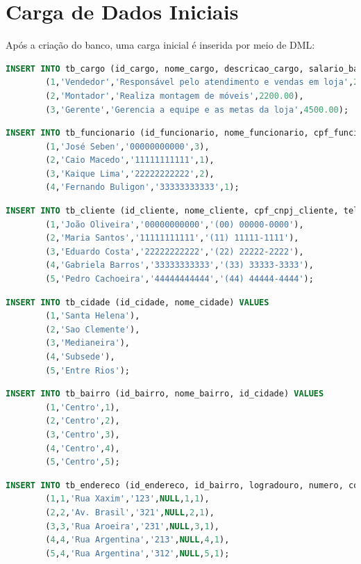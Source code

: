 \documentclass[
12pt,
a4paper,
semrecuonosumario,
sumario = abnt-6027-2012]{report}
\begin{document}
    \section{Carga de Dados Iniciais}\label{sec:carga}
    Após a criação do banco, uma carga inicial é inserida por meio de DML:
    
    \begin{lstlisting}[language=SQL,caption={DML -- Tabela \texttt{tb\_cargo}}]
		INSERT INTO tb_cargo (id_cargo, nome_cargo, descricao_cargo, salario_base) VALUES
		(1,'Vendedor','Responsável pelo atendimento e vendas em loja',2000.00),
		(2,'Montador','Realiza montagem de móveis',2200.00),
		(3,'Gerente','Gerencia a equipe e as metas da loja',4500.00);
    \end{lstlisting}
    \begin{lstlisting}[language=SQL,caption={DML -- Tabela \texttt{tb\_funcionario}}]
		INSERT INTO tb_funcionario (id_funcionario, nome_funcionario, cpf_funcionario, id_cargo) VALUES
		(1,'José Seben','00000000000',3),
		(2,'Caio Macedo','11111111111',1),
		(3,'Kaique Lima','22222222222',2),
		(4,'Fernando Buligon','33333333333',1);
    \end{lstlisting}
    \begin{lstlisting}[language=SQL,caption={DML -- Tabela \texttt{tb\_cliente}}]
		INSERT INTO tb_cliente (id_cliente, nome_cliente, cpf_cnpj_cliente, telefone_cliente) VALUES
		(1,'João Oliveira','00000000000','(00) 00000-0000'),
		(2,'Maria Santos','11111111111','(11) 11111-1111'),
		(3,'Eduardo Costa','22222222222','(22) 22222-2222'),
		(4,'Gabriela Barros','33333333333','(33) 33333-3333'),
		(5,'Pedro Cachoeira','44444444444','(44) 44444-4444');
    \end{lstlisting}
    
    \begin{lstlisting}[language=SQL,caption={DML -- Tabela \texttt{tb\_cidade}}]
		INSERT INTO tb_cidade (id_cidade, nome_cidade) VALUES
		(1,'Santa Helena'),
		(2,'Sao Clemente'),
		(3,'Medianeira'),
		(4,'Subsede'),
		(5,'Entre Rios');
    \end{lstlisting}
    
    \begin{lstlisting}[language=SQL,caption={DML -- Tabela \texttt{tb\_bairro}}]
		INSERT INTO tb_bairro (id_bairro, nome_bairro, id_cidade) VALUES
		(1,'Centro',1),
		(2,'Centro',2),
		(3,'Centro',3),
		(4,'Centro',4),
		(5,'Centro',5);
    \end{lstlisting}
    
    \begin{lstlisting}[language=SQL,caption={DML -- Tabela \texttt{tb\_endereco}}]
		INSERT INTO tb_endereco (id_endereco, id_bairro, logradouro, numero, complemento, id_cliente, prioridade) VALUES
		(1,1,'Rua Xaxim','123',NULL,1,1),
		(2,2,'Av. Brasil','321',NULL,2,1),
		(3,3,'Rua Aroeira','231',NULL,3,1),
		(4,4,'Rua Argentina','213',NULL,4,1),
		(5,4,'Rua Argentina','312',NULL,5,1);
    \end{lstlisting}
    
\end{document}
